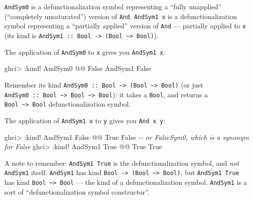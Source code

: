 \documentclass[]{article}
\newenvironment{Shaded}{}{}
\newcommand{\CommentTok}[1]{\textcolor[rgb]{0.38,0.63,0.69}{\textit{#1}}}
\newcommand{\DataTypeTok}[1]{\textcolor[rgb]{0.56,0.13,0.00}{#1}}
\newcommand{\NormalTok}[1]{#1}
\newcommand{\OperatorTok}[1]{\textcolor[rgb]{0.40,0.40,0.40}{#1}}
\begin{document}
\texttt{AndSym0} is a defunctionalization symbol representing a ``fully
unapplied'' (``completely unsaturated'') version of \texttt{And}.
\texttt{AndSym1\ x} is a defunctionalization symbol representing a ``partially
applied'' version of \texttt{And} --- partially applied to \texttt{x} (its kind
is
\texttt{AndSym1\ ::\ Bool\ -\textgreater{}\ (Bool\ \textasciitilde{}\textgreater{}\ Bool)}).

The application of \texttt{AndSym0} to \texttt{x} gives you \texttt{AndSym1\ x}:

\begin{Shaded}
\begin{Highlighting}[]
\NormalTok{ghci}\OperatorTok{\textgreater{}} \OperatorTok{:}\NormalTok{kind}\OperatorTok{!} \DataTypeTok{AndSym0} \OperatorTok{@@} \DataTypeTok{\textquotesingle{}False}
\DataTypeTok{AndSym1} \DataTypeTok{\textquotesingle{}False}
\end{Highlighting}
\end{Shaded}

Remember its kind
\texttt{AndSym0\ ::\ Bool\ \textasciitilde{}\textgreater{}\ (Bool\ \textasciitilde{}\textgreater{}\ Bool)}
(or just
\texttt{AndSym0\ ::\ Bool\ \textasciitilde{}\textgreater{}\ Bool\ \textasciitilde{}\textgreater{}\ Bool}):
it takes a \texttt{Bool}, and returns a
\texttt{Bool\ \textasciitilde{}\textgreater{}\ Bool} defunctionalization symbol.

The application of \texttt{AndSym1\ x} to \texttt{y} gives you
\texttt{And\ x\ y}:

\begin{Shaded}
\begin{Highlighting}[]
\NormalTok{ghci}\OperatorTok{\textgreater{}} \OperatorTok{:}\NormalTok{kind}\OperatorTok{!} \DataTypeTok{AndSym1} \DataTypeTok{\textquotesingle{}False} \OperatorTok{@@} \DataTypeTok{\textquotesingle{}True}
\DataTypeTok{\textquotesingle{}False}              \CommentTok{{-}{-} or FalseSym0, which is a synonym for \textquotesingle{}False}
\NormalTok{ghci}\OperatorTok{\textgreater{}} \OperatorTok{:}\NormalTok{kind}\OperatorTok{!} \DataTypeTok{AndSym1} \DataTypeTok{\textquotesingle{}True}  \OperatorTok{@@} \DataTypeTok{\textquotesingle{}True}
\DataTypeTok{\textquotesingle{}True}
\end{Highlighting}
\end{Shaded}

A note to remember: \texttt{AndSym1\ \textquotesingle{}True} is the
defunctionalization symbol, and \emph{not} \texttt{AndSym1} itself.
\texttt{AndSym1} has kind
\texttt{Bool\ -\textgreater{}\ (Bool\ \textasciitilde{}\textgreater{}\ Bool)},
but \texttt{AndSym1\ \textquotesingle{}True} has kind
\texttt{Bool\ \textasciitilde{}\textgreater{}\ Bool} --- the kind of a
defunctionalization symbol. \texttt{AndSym1} is a sort of ``defunctionalization
symbol constructor''.
\end{document}
